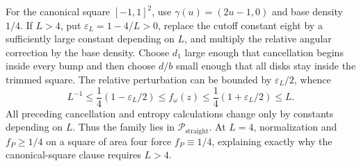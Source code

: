 For the canonical square \([-1,1]^2\), use \(\gamma(u)=(2u-1,0)\) and base density \(1/4\).  If \(L>4\), put \(\varepsilon_L=1-4/L>0\), replace the cutoff constant eight by a sufficiently large constant depending on \(L\), and multiply the relative angular correction by the base density.  Choose \(d_1\) large enough that cancellation begins inside every bump and then choose \(d/b\) small enough that all disks stay inside the trimmed square.  The relative perturbation can be bounded by \(\varepsilon_L/2\), whence
\[
 L^{-1}\leq\frac14(1-\varepsilon_L/2)
 \leq f_\omega(z)
 \leq\frac14(1+\varepsilon_L/2)\leq L.
\]
All preceding cancellation and entropy calculations change only by constants depending on \(L\).  Thus the family lies in \(\mathcal P_{\mathrm{straight}}\).  At \(L=4\), normalization and \(f_P\geq1/4\) on a square of area four force \(f_P\equiv1/4\), explaining exactly why the canonical-square clause requires \(L>4\).